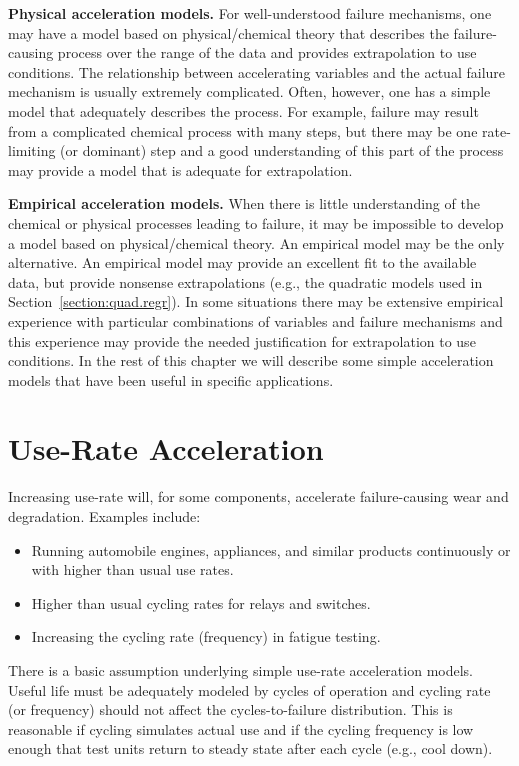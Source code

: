 {\bf Physical acceleration models.} For well-understood failure mechanisms,
one may have a model based on physical/chemical theory that describes
the failure-causing process over the range of the data and provides
extrapolation to use conditions. The relationship between accelerating
variables and the actual failure mechanism is usually extremely
complicated. Often, however, one has a simple model that adequately
describes the process.  For example, failure may result from a
complicated chemical process with many steps, but there may be one
rate-limiting (or dominant) step and a good understanding of this part
of the process may provide a model that is adequate for extrapolation.


{\bf Empirical acceleration models.} When there is little
understanding of the chemical or physical processes leading to
failure, it may be impossible to develop a model based on
physical/chemical theory.  An empirical model may be the only
alternative. An empirical model may provide an excellent fit to the
available data, but provide nonsense extrapolations (e.g., the
quadratic models used in Section~\ref{section:quad.regr}).  In some
situations there may be extensive empirical experience with
particular combinations of variables and failure mechanisms and this
experience may provide the needed justification for extrapolation to
use conditions.  In the rest of this chapter we will describe some
simple acceleration models that have been useful in specific
applications.

\section{Use-Rate Acceleration}
\label{section:use.rate.acc}
Increasing use-rate will, for some components, accelerate failure-causing
wear and degradation. Examples include:
\begin{itemize}
\item
Running automobile engines, appliances, and similar products
continuously or with higher than usual use rates.
\item
Higher than usual cycling rates for relays and switches.
\item
Increasing the cycling rate (frequency) in fatigue testing.
\end{itemize}

There is a basic assumption underlying simple use-rate acceleration models.
Useful life must be adequately modeled by cycles of operation and
cycling rate (or frequency) should not affect the cycles-to-failure
distribution. This is
reasonable if cycling simulates actual use and if the cycling
frequency is low enough that test units return to steady state after
each cycle (e.g., cool down).

